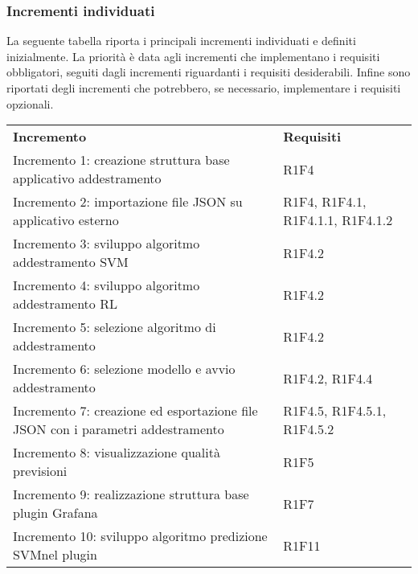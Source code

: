 \subsubsection{Incrementi individuati}
La seguente tabella riporta i principali incrementi individuati e definiti inizialmente. La priorità è data agli incrementi che implementano i requisiti obbligatori, seguiti dagli incrementi riguardanti i requisiti desiderabili. Infine sono riportati degli incrementi che potrebbero, se necessario, implementare i requisiti opzionali.
\begin{longtable} {
		>{\raggedright\arraybackslash}p{85mm}
		>{\raggedleft\arraybackslash}p{40mm}
	}
	\rowcolor{gray!50} 
	\textbf{Incremento} & 
	\textbf{Requisiti} 	\TBstrut \\
	
	Incremento 1: creazione struttura base applicativo addestramento &
	R1F4  \TBstrut \\ [2mm]		
	
	Incremento 2: importazione file JSON su applicativo esterno & 
	R1F4, R1F4.1, R1F4.1.1, R1F4.1.2  \TBstrut \\ [2mm]
	
	Incremento 3: sviluppo algoritmo addestramento SVM\glosp & 
	R1F4.2  \TBstrut \\ [2mm]
	
	Incremento 4: sviluppo algoritmo addestramento RL\glosp & 
	R1F4.2  \TBstrut \\ [2mm]
	
	Incremento 5: selezione algoritmo di addestramento & 
	R1F4.2  \TBstrut \\ [2mm]
	
	Incremento 6: selezione modello e avvio addestramento & 
	R1F4.2, R1F4.4 \TBstrut \\ [2mm]
	
	Incremento 7: creazione ed esportazione file JSON con i parametri addestramento &
	R1F4.5, R1F4.5.1, R1F4.5.2 \TBstrut \\ [2mm]
	
	Incremento 8: visualizzazione qualità previsioni &
	R1F5 \TBstrut \\ [2mm]
	
	Incremento 9: realizzazione struttura base plugin Grafana\glosp &
	R1F7 \TBstrut \\ [2mm]
	
	Incremento 10: sviluppo algoritmo predizione SVM\glosp nel plugin &
	R1F11 \TBstrut \\ [2mm]
	

\end{longtable}
